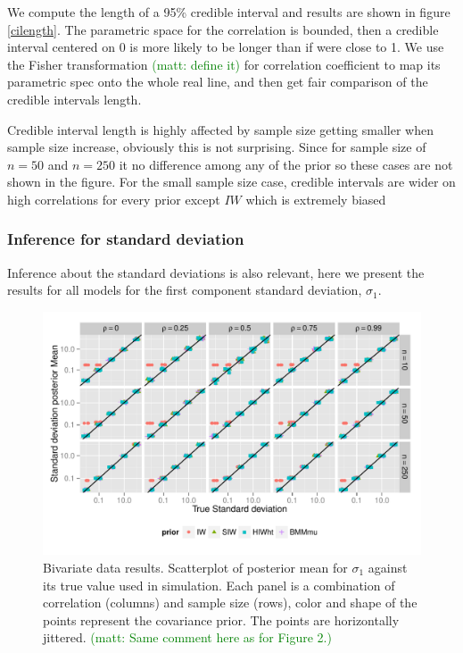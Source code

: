 \documentclass[a4paper]{article}
\newcommand{\matt}[1]{\textcolor{green}{(matt: #1)}}
\begin{document}
We compute the length of a 95\% credible interval and results are shown in figure \ref{cilength}. The parametric space for the correlation is bounded, then a credible interval centered on 0 is more likely to be longer than if were close to 1. We use the Fisher transformation \matt{define it} for correlation coefficient to  map its parametric spec onto the whole real line, and then get fair comparison of the credible intervals length. 

Credible interval length is highly affected by sample size getting smaller when sample size increase, obviously this is not surprising.  Since for sample size of $n=50$ and $n=250$ it no difference among any of the prior so these cases are not shown in the figure. For the small sample size case, credible intervals are wider on high correlations for every prior except $IW$ which is extremely biased

\subsubsection{Inference for standard deviation}
Inference about the standard deviations is also relevant, here we present the results for all models for the first component standard deviation, $\sigma_1$. 
\begin{figure}[htbp]
   \centering
   \includegraphics[width=\textwidth]{fig_s1_d2} 
    \vspace{-.5in}
   \caption{Bivariate data results. Scatterplot of posterior mean for $\sigma_1$  against its true value used in simulation. Each panel is a combination of correlation (columns) and sample size (rows),  color and shape of the points represent the covariance prior. The points are horizontally jittered. \label{devF1} \matt{Same comment here as for Figure 2.}}
\end{figure}
\end{document}

